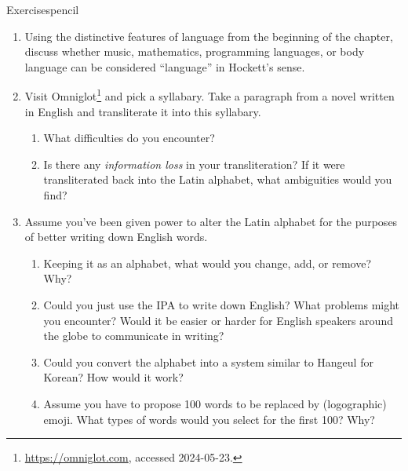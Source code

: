 \begin{tblsfilledsymbol}{Exercises}{pencil}

\begin{enumerate}

\item Using the distinctive features of language from the beginning of the chapter, discuss whether music, mathematics, programming languages, or body language can be considered ``language'' in Hockett's sense.



\item  Visit Omniglot\footnote{\url{https://omniglot.com}, accessed 2024-05-23.} and pick a
  syllabary.  Take a paragraph from a novel written in English and
  transliterate it into this syllabary.
  \begin{enumerate}
  \item What difficulties do you encounter?
  \item Is there any \emph{information loss} in your transliteration?
    If it were transliterated back into the Latin alphabet, what
    ambiguities would you find?
  \end{enumerate}
\item  Assume you've been given power to alter the Latin
  alphabet for the purposes of better writing down English words.
  \begin{enumerate}
  \item Keeping it as an alphabet, what would you change, add, or
    remove?  Why?
  \item Could you just use the IPA to write down English?  What
    problems might you encounter?  Would it be easier or harder for English speakers around the globe to communicate in writing?
  \item Could you convert the alphabet into a system similar to
    Hangeul for Korean?  How would it work?
  \item Assume you have to propose 100 words to be replaced by (logographic) emoji.  What types of words would you select for the first 100?
    Why?
  \end{enumerate}
\end{enumerate}

\begin{enumerate}
  \setcounter{enumi}{2} 


\end{enumerate}
\end{tblsfilledsymbol}
